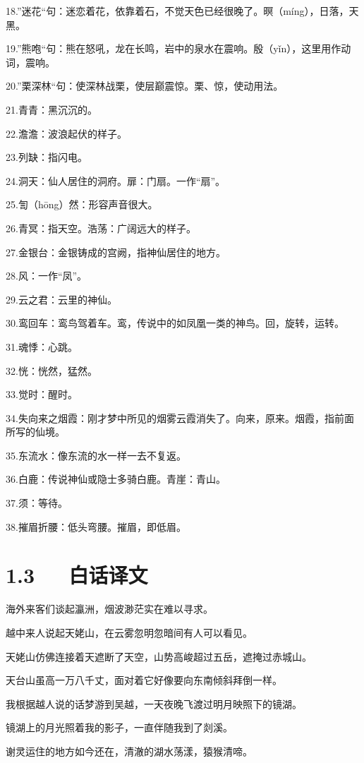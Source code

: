 \documentclass[letterpaper,12pt,english]{sphinxmanual}
\begin{document}
18.”迷花“句：迷恋着花，依靠着石，不觉天色已经很晚了。暝（míng），日落，天黑。

19.”熊咆“句：熊在怒吼，龙在长鸣，岩中的泉水在震响。殷（yǐn），这里用作动词，震响。

20.”栗深林“句：使深林战栗，使层巅震惊。栗、惊，使动用法。

21.青青：黑沉沉的。

22.澹澹：波浪起伏的样子。

23.列缺：指闪电。

24.洞天：仙人居住的洞府。扉：门扇。一作“扇”。

25.訇（hōng）然：形容声音很大。

26.青冥：指天空。浩荡：广阔远大的样子。

27.金银台：金银铸成的宫阙，指神仙居住的地方。

28.风：一作“凤”。

29.云之君：云里的神仙。

30.鸾回车：鸾鸟驾着车。鸾，传说中的如凤凰一类的神鸟。回，旋转，运转。

31.魂悸：心跳。

32.恍：恍然，猛然。

33.觉时：醒时。

34.失向来之烟霞：刚才梦中所见的烟雾云霞消失了。向来，原来。烟霞，指前面所写的仙境。

35.东流水：像东流的水一样一去不复返。

36.白鹿：传说神仙或隐士多骑白鹿。青崖：青山。

37.须：等待。

38.摧眉折腰：低头弯腰。摧眉，即低眉。


\section{1.3   白话译文}
\label{\detokenize{p01_u6563_u6587/_u674e_u767d-_u68a6_u6e38_u5929_u59e5_u541f_u7559_u522b:id5}}
海外来客们谈起瀛洲，烟波渺茫实在难以寻求。

越中来人说起天姥山，在云雾忽明忽暗间有人可以看见。

天姥山仿佛连接着天遮断了天空，山势高峻超过五岳，遮掩过赤城山。

天台山虽高一万八千丈，面对着它好像要向东南倾斜拜倒一样。

我根据越人说的话梦游到吴越，一天夜晚飞渡过明月映照下的镜湖。

镜湖上的月光照着我的影子，一直伴随我到了剡溪。

谢灵运住的地方如今还在，清澈的湖水荡漾，猿猴清啼。
\end{document}
